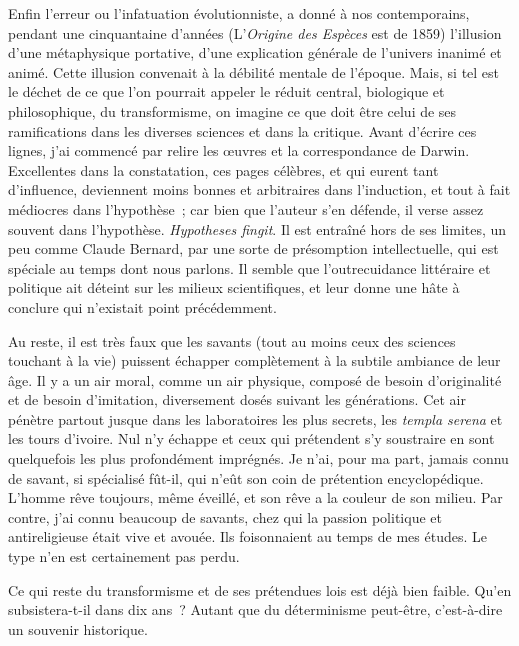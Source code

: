 \documentclass[french,twoside]{book} %
\begin{document}
Enfin l’erreur ou l’infatuation évolutionniste, a donné à nos contemporains, pendant une cinquantaine d’années (L’{\itshape Origine des Espèces} est de 1859) l’illusion d’une métaphysique portative, d’une explication générale de l’univers inanimé et animé. Cette illusion convenait à la débilité mentale de l’époque. Mais, si tel est le déchet de ce que l’on pourrait appeler le réduit central, biologique et philosophique, du transformisme, on imagine ce que doit être celui de ses ramifications dans les diverses sciences et dans la critique. Avant d’écrire ces lignes, j’ai commencé par relire les œuvres et la correspondance de Darwin. Excellentes dans la constatation, ces pages célèbres, et qui eurent tant d’influence, deviennent moins bonnes et arbitraires dans l’induction, et tout à fait médiocres dans l’hypothèse ; car bien que l’auteur s’en défende, il verse assez souvent dans l’hypothèse. {\itshape Hypotheses fingit}. Il est entraîné hors de ses limites, un peu comme Claude Bernard, par une sorte de présomption intellectuelle, qui est spéciale au temps dont nous parlons. Il semble que l’outrecuidance littéraire et politique ait déteint sur les milieux scientifiques, et leur donne une hâte à conclure qui n’existait point précédemment.\par
Au reste, il est très faux que les savants (tout au moins ceux des sciences touchant à la vie) puissent échapper complètement à la subtile ambiance de leur âge. Il y a un air moral, comme un air physique, composé de besoin d’originalité et de besoin d’imitation, diversement dosés suivant les générations. Cet air pénètre partout jusque dans les laboratoires les plus secrets, les {\itshape templa serena} et les tours d’ivoire. Nul n’y échappe et ceux qui prétendent s’y soustraire en sont quelquefois les plus profondément imprégnés. Je n’ai, pour ma part, jamais connu de savant, si spécialisé fût-il, qui n’eût son coin de prétention encyclopédique. L’homme rêve toujours, même éveillé, et son rêve a la couleur de son milieu. Par contre, j’ai connu beaucoup de savants, chez qui la passion politique et antireligieuse était vive et avouée. Ils foisonnaient au temps de mes études. Le type n’en est certainement pas perdu.\par
Ce qui reste du transformisme et de ses prétendues lois est déjà bien faible. Qu’en subsistera-t-il dans dix ans ? Autant que du déterminisme peut-être, c’est-à-dire un souvenir historique.\par
\end{document}
